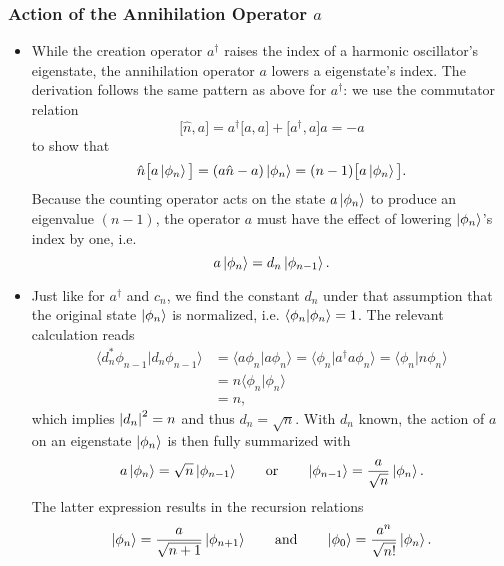 \documentclass[11pt, a4paper]{article}
\newcommand{\eqtext}[1]{\qquad \text{#1} \qquad}
\newcommand{\bbraket}[2]{\big \langle {#1} \big | {#2} \big \rangle}  %
\renewcommand{\k}[1]{\ket{#1}}
\begin{document}
\subsubsection{Action of the Annihilation Operator $ a $}
\begin{itemize}
	\item While the creation operator $ a^{\dagger} $ raises the index of a harmonic oscillator's eigenstate, the annihilation operator $ a $ lowers a eigenstate's index. The derivation follows the same pattern as above for $ a^{\dagger} $: we use the commutator relation
	\begin{equation*}
		\big[\hat{n}, a\big] = a^{\dagger}\big[a, a\big] + \big[a^{\dagger}, a\big]a = - a
	\end{equation*}
	to show that
	\begin{equation*}
        \hat{n} \big[ a \ket{\phi_{n}} \big] = (a \hat{n} - a)\ket{\phi_{n}} = (n-1) \big[ a\ket{\phi_{n}} \big].
	\end{equation*}
	Because the counting operator acts on the state $ a\k{\phi_{n}} $ to produce an eigenvalue $ (n-1) $, the operator $ a $ must have the effect of lowering $ \ket{\phi_{n}} $'s index by one, i.e.
	\begin{equation*}
		a\ket{\phi_{n}} = d_{n}\ket{\phi_{n-1}}.
	\end{equation*}
	
	\item Just like for $ a^{\dagger} $ and $ c_{n} $, we find the constant $ d_{n} $ under that assumption that the original state $ \ket{\phi_{n}} $ is normalized, i.e. $ \braket{\phi_{n}}{\phi_{n}} = 1 $. The relevant calculation reads
 	\begin{align*}
        \bbraket{d_{n}^{*}\phi_{n-1}}{d_{n}\phi_{n-1}} &= \bbraket{a\phi_{n}}{a\phi_{n}} = \bbraket{\phi_{n}}{a^{\dagger}a\phi_{n}} = \bbraket{\phi_{n}}{n\phi_{n}} \\
        & = n \bbraket{\phi_{n}}{\phi_{n}} \\
        & = n,
 	\end{align*}
 	which implies $ \abs{d_{n}}^{2} = n $ and thus $ d_{n} = \sqrt{n} $. With $ d_{n} $ known, the action of $ a $ on an eigenstate $ \ket{\phi_{n}} $ is then fully summarized with
 	\begin{equation*}
 		a\k{\phi_{n}} = \sqrt{n}\ket{\phi_{n-1}} \eqtext{or} \ket{\phi_{n - 1}} = \frac{a}{\sqrt{n}}\k{\phi_{n}}. 
 	\end{equation*}
 	The latter expression results in the recursion relations
 	\begin{equation*}
 		\ket{\phi_{n}} = \frac{a}{\sqrt{n+1}}\ket{\phi_{n+1}} \eqtext{and} \ket{\phi_{0}} = \frac{a^{n}}{\sqrt{n!}}\ket{\phi_{n}}.
 	\end{equation*}
 	

\end{itemize}
\end{document}
